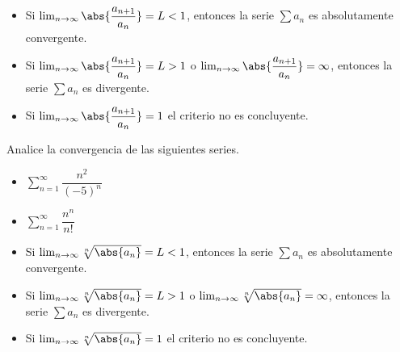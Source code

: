 \begin{frame}
  \begin{thm}
    \begin{itemize}
      \item Si $\lim_{n\to\infty}\abs{\dfrac{a_{n+1}}{a_n}}=L<1$, entonces la serie $\sum a_n$ es absolutamente convergente.\\
      \vspace{0.5cm}
      \item Si $\lim_{n\to\infty}\abs{\dfrac{a_{n+1}}{a_n}}=L>1$ o $\lim_{n\to\infty}\abs{\dfrac{a_{n+1}}{a_n}}=\infty$, entonces la serie $\sum a_n$ es divergente.\\
      \vspace{0.5cm}
      \item Si $\lim_{n\to\infty}\abs{\dfrac{a_{n+1}}{a_n}}=1$ el criterio no es concluyente.
    \end{itemize}
  \end{thm}
\end{frame}

\begin{frame}
  \begin{egs}
    Analice la convergencia de las siguientes series.
    \begin{itemize}[<+->]
      \item $\displaystyle \sum_{n=1}^{\infty}\dfrac{n^2}{(-5)^n}$\\
      \vspace{0.5cm}
      \item $\displaystyle \sum_{n=1}^{\infty}\dfrac{n^n}{n!}$\\
    \end{itemize}
  \end{egs}
\end{frame}

\begin{frame}
  \begin{thm}
    \begin{itemize}
      \item Si $\lim_{n\to\infty}\sqrt[n]{\abs{a_n}}=L<1$, entonces la serie $\sum a_n$ es absolutamente convergente.\\
      \vspace{0.5cm}
      \item Si $\lim_{n\to\infty}\sqrt[n]{\abs{a_n}}=L>1$ o $\lim_{n\to\infty}\sqrt[n]{\abs{a_n}}=\infty$, entonces la serie $\sum a_n$ es divergente.\\
      \vspace{0.5cm}
      \item Si $\lim_{n\to\infty}\sqrt[n]{\abs{a_n}}=1$ el criterio no es concluyente.
    \end{itemize}
  \end{thm}
\end{frame}

